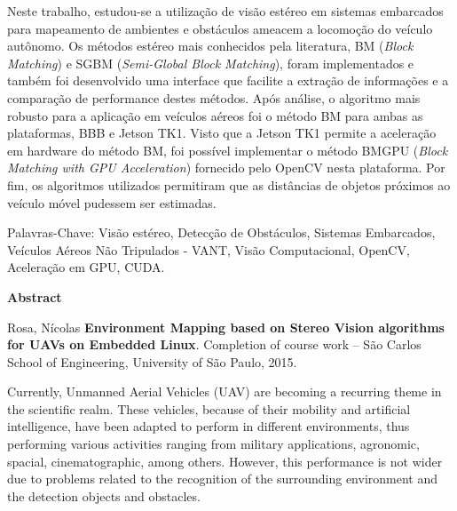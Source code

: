 Neste trabalho, estudou-se a utilização de visão estéreo em sistemas embarcados para mapeamento de ambientes e obstáculos ameacem a locomoção do veículo autônomo. Os métodos estéreo mais conhecidos pela literatura, BM (\textit{Block Matching}) e SGBM (\textit{Semi-Global Block Matching}), foram implementados e também foi desenvolvido uma interface que facilite a extração de informações e a comparação de performance destes métodos. Após análise, o algoritmo mais robusto para a aplicação em veículos aéreos foi o método BM para ambas as plataformas, BBB e Jetson TK1. Visto que a Jetson TK1 permite a aceleração em hardware do método BM, foi possível implementar o método BMGPU (\textit{Block Matching with GPU Acceleration}) fornecido pelo OpenCV nesta plataforma. Por fim, os algoritmos utilizados permitiram que as distâncias de objetos próximos ao veículo móvel pudessem ser estimadas.

\vspace{0.05\textheight}

Palavras-Chave: Visão estéreo, Detecção de Obstáculos, Sistemas Embarcados, Veículos Aéreos Não Tripulados - VANT, Visão Computacional, OpenCV, Aceleração em GPU, CUDA.

\cleardoublepage

\vspace{0.11\textheight} 

\begin{center}
\textbf{\Huge{Abstract}}
\end{center}

\vspace{0.05\textheight}
Rosa, Nícolas \textbf{Environment Mapping based on Stereo Vision algorithms for UAVs on Embedded Linux}. Completion of course work -- São Carlos School of Engineering, University of São Paulo, 2015.

Currently, Unmanned Aerial Vehicles (UAV) are becoming a recurring theme in the scientific realm. These vehicles, because of their mobility and artificial intelligence, have been adapted to perform in different environments, thus performing various activities ranging from
military applications, agronomic, spacial, cinematographic, among others. However, this performance is not wider due to  problems related to the recognition of the surrounding environment and the detection objects and obstacles. 

